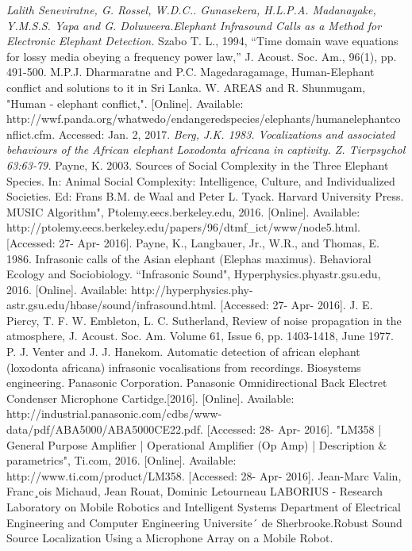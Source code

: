 \documentclass[12pt]{article}
\numberwithin{figure}{section}
\numberwithin{table}{section}
\begin{document}
\begin{thebibliography}{1}
 \emph{ Lalith Seneviratne, G. Rossel, W.D.C.. Gunasekera, H.L.P.A. Madanayake, Y.M.S.S. Yapa and G. Doluweera.Elephant Infrasound Calls as a Method for Electronic Elephant Detection.}
 Szabo T. L., 1994, “Time domain wave equations for lossy media obeying a frequency power law,” J. Acoust. Soc. Am., 96(1), pp. 491-500.
M.P.J. Dharmaratne and P.C. Magedaragamage, Human-Elephant conflict and solutions to it in Sri Lanka.
 W. AREAS and R. Shunmugam, "Human - elephant conflict,". [Online]. Available: http://wwf.panda.org/whatwedo/endangeredspecies/elephants/humanelephantconflict.cfm. Accessed: Jan. 2, 2017.
 \emph{Berg, J.K. 1983. Vocalizations and associated behaviours of the African elephant Loxodonta africana in captivity. Z. Tierpsychol 63:63-79.}
Payne, K. 2003. Sources of Social Complexity in the Three Elephant Species. In: Animal Social Complexity: Intelligence, Culture, and Individualized Societies. Ed: Frans B.M. de Waal and Peter L. Tyack. Harvard University Press.
 MUSIC Algorithm", Ptolemy.eecs.berkeley.edu, 2016. [Online]. Available: http://ptolemy.eecs.berkeley.edu/papers/96/dtmf\_ict/www/node5.html. [Accessed: 27- Apr- 2016].
 Payne, K., Langbauer, Jr., W.R., and Thomas, E. 1986. Infrasonic calls of the Asian elephant (Elephas maximus). Behavioral Ecology and Sociobiology.
 “Infrasonic Sound", Hyperphysics.phyastr.gsu.edu, 2016. [Online]. Available: http://hyperphysics.phy-astr.gsu.edu/hbase/sound/infrasound.html. [Accessed: 27- Apr- 2016].
 J. E. Piercy, T. F. W. Embleton, L. C. Sutherland, Review of noise propagation in the atmosphere, J. Acoust. Soc. Am. Volume 61, Issue 6, pp. 1403-1418, June 1977.
 P. J. Venter and J. J. Hanekom. Automatic detection of african elephant (loxodonta africana) infrasonic vocalisations from recordings. Biosystems engineering.
 Panasonic Corporation. Panasonic Omnidirectional Back Electret Condenser Microphone Cartidge.[2016].  [Online]. Available: http://industrial.panasonic.com/cdbs/www-data/pdf/ABA5000/ABA5000CE22.pdf. [Accessed: 28- Apr- 2016].
"LM358 | General Purpose Amplifier | Operational Amplifier (Op Amp) | Description \& parametrics", Ti.com, 2016. [Online]. Available: http://www.ti.com/product/LM358. [Accessed: 28- Apr- 2016].
Jean-Marc Valin, Franc¸ois Michaud, Jean Rouat, Dominic Letourneau LABORIUS - Research Laboratory on Mobile Robotics and Intelligent Systems Department of Electrical Engineering and Computer Engineering Universite´ de Sherbrooke.Robust Sound Source Localization Using a Microphone Array on a Mobile Robot.

\end{thebibliography}
\end{document}
